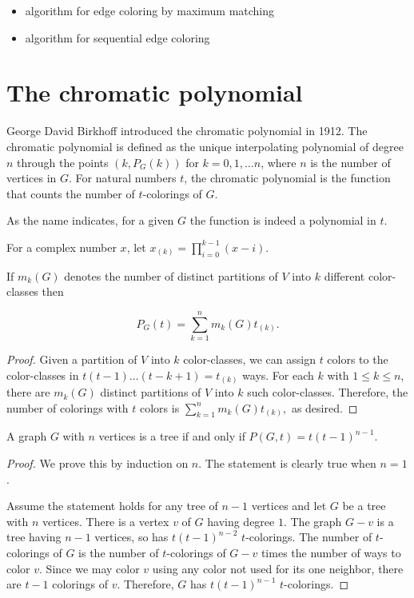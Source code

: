 \begin{itemize}
\item algorithm for edge coloring by maximum matching
\item algorithm for sequential edge coloring
\end{itemize}



\section{The chromatic polynomial}

George David Birkhoff introduced the chromatic polynomial in 1912.
The chromatic polynomial is defined as the unique interpolating
polynomial of degree $n$ through the points $(k,P_G(k))$ for
$k=0,1,\dots n$, where $n$ is the number of vertices in $G$.
For natural numbers $t$, the chromatic polynomial is the function
that counts the
number of $t$-colorings of $G$.

As the name indicates, for a given $G$ the function is indeed a
polynomial in $t$.

For a complex number $x$, let $x_{(k)}=\prod_{i=0}^{k-1} (x-i)$.

\begin{lemma}
If $m_k(G)$ denotes the number of distinct partitions of $V$
into $k$ different color-classes then

\[
P_G(t) = \sum_{k=1}^n m_k(G)t_{(k)}.
\]
\end{lemma}


\begin{proof}
Given a partition of $V$ into $k$ color-classes, we can assign
$t$ colors to the color-classes in $t(t-1)\dots (t-k+1)=t_{(k)}$ ways.
For each $k$ with $1\leq k\leq n$, there are
$m_k(G)$ distinct partitions of $V$ into $k$ such color-classes.
Therefore, the number of colorings with $t$ colors is
$ \sum_{k=1}^n m_k(G)t_{(k)},$ as desired.

\end{proof}



\begin{theorem}
A graph $G$ with $n$ vertices is a tree if and only if $P(G, t) =
t(t-1)^{n-1}$.
\end{theorem}

\begin{proof}
We prove this by induction on $n$. The statement is clearly
true when $n=1$.

Assume the statement holds for any tree of $n-1$ vertices
and let $G$ be a tree with $n$ vertices. There is a vertex $v$
of $G$ having degree $1$. The graph $G-v$ is a tree having $n-1$
vertices, so has $t(t-1)^{n-2}$ $t$-colorings. The number of
$t$-colorings of $G$ is the number of $t$-colorings of $G-v$ times the
number of ways to color $v$. Since we may color $v$ using any
color not used for its one neighbor, there are $t-1$ colorings of $v$.
Therefore, $G$ has $t(t-1)^{n-1}$ $t$-colorings.

\end{proof}

